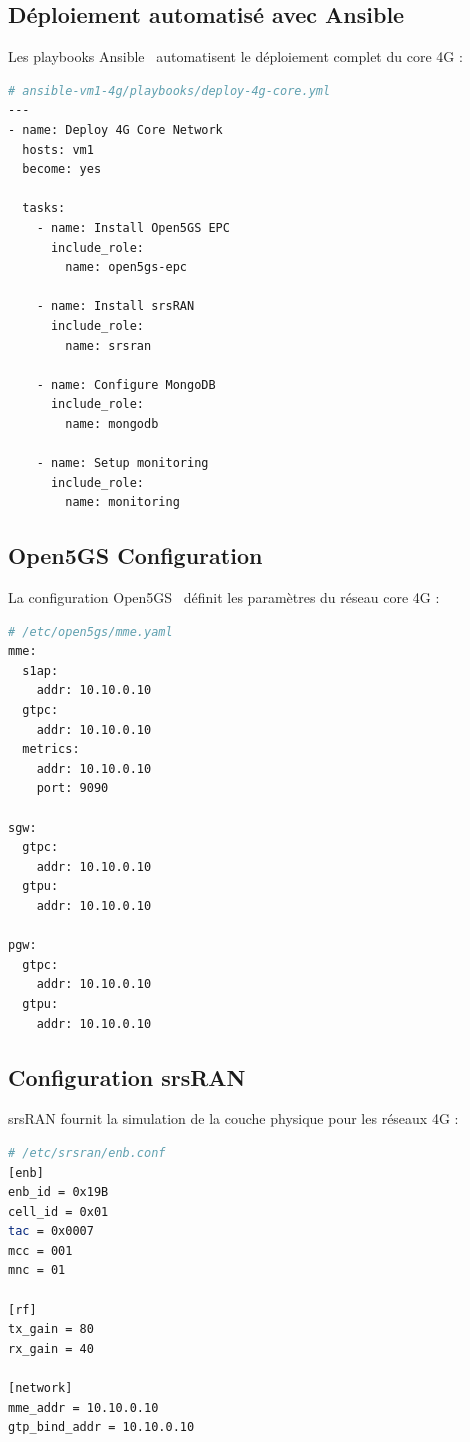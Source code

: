 \documentclass[12pt,a4paper]{report}
\begin{document}
\subsection{Déploiement automatisé avec Ansible}

Les playbooks Ansible~\cite{ansible-docs} automatisent le déploiement complet du core 4G :

\begin{lstlisting}[caption=Playbook Ansible - Déploiement 4G, language=bash]
# ansible-vm1-4g/playbooks/deploy-4g-core.yml
---
- name: Deploy 4G Core Network
  hosts: vm1
  become: yes
  
  tasks:
    - name: Install Open5GS EPC
      include_role:
        name: open5gs-epc
        
    - name: Install srsRAN
      include_role:
        name: srsran
        
    - name: Configure MongoDB
      include_role:
        name: mongodb
        
    - name: Setup monitoring
      include_role:
        name: monitoring
\end{lstlisting}

\subsection{Open5GS Configuration}

La configuration Open5GS~\cite{open5gs-docs} définit les paramètres du réseau core 4G :

\begin{lstlisting}[caption=Configuration Open5GS EPC, language=bash]
# /etc/open5gs/mme.yaml
mme:
  s1ap:
    addr: 10.10.0.10
  gtpc:
    addr: 10.10.0.10
  metrics:
    addr: 10.10.0.10
    port: 9090

sgw:
  gtpc:
    addr: 10.10.0.10
  gtpu:
    addr: 10.10.0.10

pgw:
  gtpc:
    addr: 10.10.0.10
  gtpu:
    addr: 10.10.0.10
\end{lstlisting}

\subsection{Configuration srsRAN}

srsRAN fournit la simulation de la couche physique pour les réseaux 4G :

\begin{lstlisting}[caption=Configuration eNB srsRAN, language=bash]
# /etc/srsran/enb.conf
[enb]
enb_id = 0x19B
cell_id = 0x01
tac = 0x0007
mcc = 001
mnc = 01

[rf]
tx_gain = 80
rx_gain = 40

[network]
mme_addr = 10.10.0.10
gtp_bind_addr = 10.10.0.10
\end{lstlisting}
\end{document}
